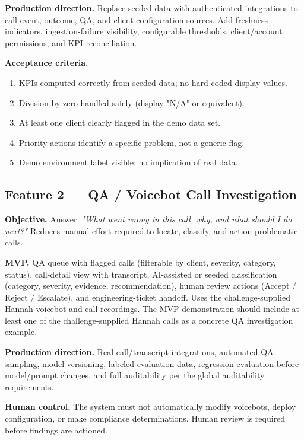 \documentclass[11pt,a4paper]{article}
\begin{document}
\textbf{Production direction.} Replace seeded data with authenticated integrations to call-event, outcome, QA, and client-configuration sources. Add freshness indicators, ingestion-failure visibility, configurable thresholds, client/account permissions, and KPI reconciliation.

\textbf{Acceptance criteria.}
\begin{enumerate}
  \item KPIs computed correctly from seeded data; no hard-coded display values.
  \item Division-by-zero handled safely (display "N/A" or equivalent).
  \item At least one client clearly flagged in the demo data set.
  \item Priority actions identify a specific problem, not a generic flag.
  \item Demo environment label visible; no implication of real data.
\end{enumerate}

\subsection{Feature 2 — QA / Voicebot Call Investigation}

\textbf{Objective.} Answer: \emph{"What went wrong in this call, why, and what should I do next?"} Reduces manual effort required to locate, classify, and action problematic calls.

\textbf{MVP.} QA queue with flagged calls (filterable by client, severity, category, status), call-detail view with transcript, AI-assisted or seeded classification (category, severity, evidence, recommendation), human review actions (Accept / Reject / Escalate), and engineering-ticket handoff. Uses the challenge-supplied Hannah voicebot and call recordings. The MVP demonstration should include at least one of the challenge-supplied Hannah calls as a concrete QA investigation example.

\textbf{Production direction.} Real call/transcript integrations, automated QA sampling, model versioning, labeled evaluation data, regression evaluation before model/prompt changes, and full auditability per the global auditability requirements.

\textbf{Human control.} The system must not automatically modify voicebots, deploy configuration, or make compliance determinations. Human review is required before findings are actioned.
\end{document}

